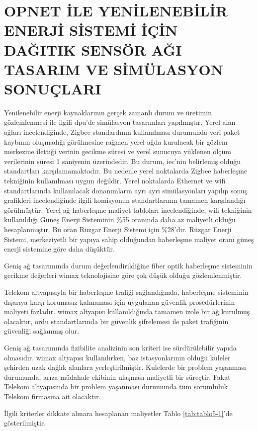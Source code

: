 \part{OPNET İLE YENİLENEBİLİR ENERJİ SİSTEMİ İÇİN DAĞITIK SENSÖR AĞI TASARIM VE SİMÜLASYON SONUÇLARI}
\thispagestyle{empty}
\newpage
Yenilenebilir enerji kaynaklarının gerçek zamanlı durum ve üretimin gözlemlenmesi ile ilgili \gls{dpu}'de simülasyon tasarımları yapılmıştır. Yerel alan ağları incelendiğinde, Zigbee standardının kullanılması durumunda veri paket kaybının oluşmadığı görülmesine rağmen yerel ağda kurulacak bir gözlem merkezine ilettiği verinin gecikme süresi ve yerel sunucuya yüklenen ölçüm verilerinin süresi 1 saniyenin üzerindedir. Bu durum, \gls{iec}'nin belirlemiş olduğu standartları karşılamamaktadır. Bu nedenle yerel noktalarda Zigbee haberleşme tekniğinin kullanılması uygun değildir. Yerel noktalarda Ethernet ve \gls{wifi} standartlarında kullanılacak donanımların ayrı ayrı simülasyonları yapılıp sonuç grafikleri incelendiğinde ilgili komisyonun standartlarının tamamen karşılandığı görülmüştür. Yerel ağ haberleşme maliyet tabloları incelendiğinde, \gls{wifi} tekniğinin kullanıldığı Güneş Enerji Sisteminin \%55 oranında daha az maliyetli olduğu hesaplanmıştır. Bu oran Rüzgar Enerji Sistemi için \%28’dir. Rüzgar Enerji Sistemi, merkeziyetli bir yapıya sahip olduğundan haberleşme maliyet oranı güneş enerji sistemine göre daha düşüktür.

Geniş ağ tasarımında durum değerlendirildiğine fiber optik haberleşme sisteminin gecikme değerleri \gls{wimax} teknolojisine göre çok düşük olduğu gözlemlenmiştir. 

Telekom altyapısıyla bir haberleşme trafiği sağlandığında, haberleşme sisteminin dışarıya karşı korumasız kalmaması için uygulanan güvenlik prosedürlerinin maliyeti fazladır. \gls{wimax} altyapısı kullanıldığında tamamen izole bir ağ kurulmuş olacaktır, ordu standartlarında bir güvenlik şifrelemesi ile paket trafiğinin güvenliği sağlanmış olur.

Geniş ağ tasarımında fizibilite analizinin son kriteri ise sürdürülebilir yapıda olmasıdır. \gls{wimax} altyapısı kullanılırken, baz istasyonlarının olduğu kuleler şehirden uzak dağlık alanlara yerleştirilmiştir. Kulelerde bir problem yaşanması durumunda, arıza müdahale ekibinin ulaşması maliyetli bir süreçtir. Fakat Telekom altyapısında bir problem yaşanması durumunda tüm sorumluluk Telekom firmasına ait olacaktır. 

İlgili kriterler dikkate alınara hesaplanan maliyetler  Tablo \ref{tab:tablo5-1}’de gösterilmiştir.

